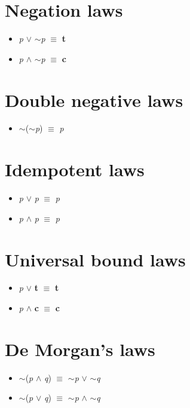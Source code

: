 \documentclass{article}
\begin{document}
\section{Negation laws}
\begin{itemize}
\item \textit{p} $\lor$ $\sim$\textit{p} $\equiv$ \textbf{t}
\item \textit{p} $\wedge$ $\sim$\textit{p} $\equiv$ \textbf{c}
\end{itemize}

\section{Double negative laws}
\begin{itemize}
\item $\sim$($\sim$\textit{p}) $\equiv$ \textit{p}
\end{itemize}

\section{Idempotent laws}
\begin{itemize}
\item \textit{p} $\lor$ \textit{p} $\equiv$ \textit{p}
\item \textit{p} $\wedge$ \textit{p} $\equiv$ \textit{p}
\end{itemize}

\section{Universal bound laws}
\begin{itemize}
\item \textit{p} $\lor$ \textbf{t} $\equiv$ \textbf{t}
\item \textit{p} $\wedge$ \textbf{c} $\equiv$ \textbf{c}
\end{itemize}

\section{De Morgan's laws}
\begin{itemize}
\item $\sim$(\textit{p} $\wedge$ \textit{q}) $\equiv$ $\sim$\textit{p} $\lor$ $\sim$\textit{q}
\item $\sim$(\textit{p} $\lor$ \textit{q}) $\equiv$ $\sim$\textit{p} $\wedge$ $\sim$\textit{q}
\end{itemize}
\end{document}
